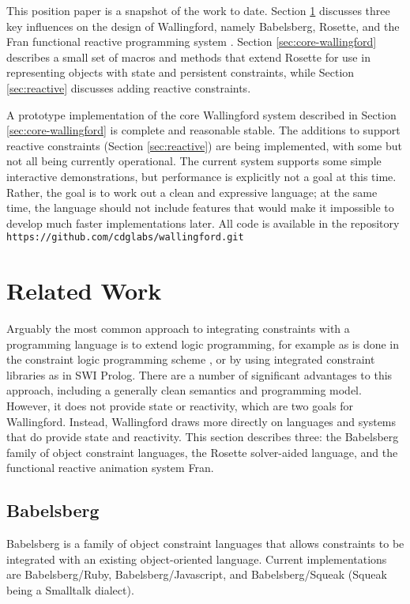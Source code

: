 \documentclass[reprint]{sigplanconf}
\begin{document}
This position paper is a snapshot of the work to date.  Section
\ref{sec:related-work} discusses three key influences on the design of
Wallingford, namely Babelsberg, Rosette, and the Fran
functional reactive programming system
\cite{elliot-icfp-1997}.  Section \ref{sec:core-wallingford} describes a small
set of macros and methods that extend Rosette for use in representing
objects with state and persistent constraints, while Section
\ref{sec:reactive} discusses adding reactive constraints.

A prototype implementation of the core Wallingford system described in
Section \ref{sec:core-wallingford} is complete and reasonable stable.
The additions to support reactive constraints (Section
\ref{sec:reactive}) are being implemented, with some but not all being
currently operational.  The current system supports some simple
interactive demonstrations, but performance is explicitly not a goal
at this time.  Rather, the goal is to work out a clean and expressive
language; at the same time, the language should not include features
that would make it impossible to develop much faster implementations
later.  All code is available in the repository
\verb|https://github.com/cdglabs/wallingford.git|

\section{Related Work}
\label{sec:related-work}

Arguably the most common approach to integrating constraints with a
programming language is to extend logic programming, for example as is
done in the constraint logic programming scheme
\cite{jaffar-popl-1987}, or by using integrated constraint libraries
as in SWI Prolog.  There are a number of significant advantages to
this approach, including a generally clean semantics and programming
model.  However, it does not provide state or reactivity, which are
two goals for Wallingford.  Instead, Wallingford draws more directly
on languages and systems that do provide state and reactivity.  This
section describes three: the Babelsberg family of object constraint
languages, the Rosette solver-aided language, and the functional
reactive animation system Fran.

\subsection{Babelsberg}
\label{sec:babelsberg}

Babelsberg is a family of
object constraint languages that allows constraints to be integrated with
an existing object-oriented language.  Current
implementations are Babelsberg/Ruby, Babelsberg/Javascript, and
Babelsberg/Squeak (Squeak being a Smalltalk dialect).
\end{document}
